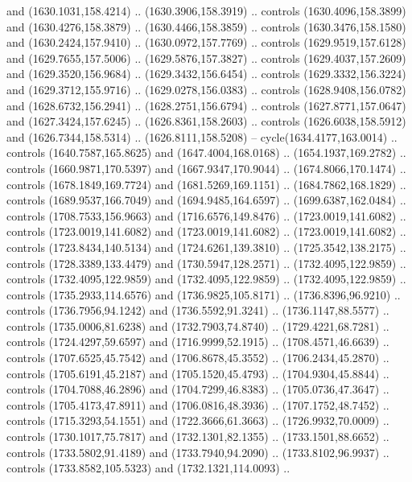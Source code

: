 \begin{scope}[shift={(-22.88722,-49.76189)}]
\begin{scope}[shift={(-739.46591,328.36782)}]
      and (1630.1031,158.4214) .. (1630.3906,158.3919) .. controls
      (1630.4096,158.3899) and (1630.4276,158.3879) .. (1630.4466,158.3859) ..
      controls (1630.3476,158.1580) and (1630.2424,157.9410) .. (1630.0972,157.7769)
      .. controls (1629.9519,157.6128) and (1629.7655,157.5006) ..
      (1629.5876,157.3827) .. controls (1629.4037,157.2609) and (1629.3520,156.9684)
      .. (1629.3432,156.6454) .. controls (1629.3332,156.3224) and
      (1629.3712,155.9716) .. (1629.0278,156.0383) .. controls (1628.9408,156.0782)
      and (1628.6732,156.2941) .. (1628.2751,156.6794) .. controls
      (1627.8771,157.0647) and (1627.3424,157.6245) .. (1626.8361,158.2603) ..
      controls (1626.6038,158.5912) and (1626.7344,158.5314) .. (1626.8111,158.5208)
      -- cycle(1634.4177,163.0014) .. controls (1640.7587,165.8625) and
      (1647.4004,168.0168) .. (1654.1937,169.2782) .. controls (1660.9871,170.5397)
      and (1667.9347,170.9044) .. (1674.8066,170.1474) .. controls
      (1678.1849,169.7724) and (1681.5269,169.1151) .. (1684.7862,168.1829) ..
      controls (1689.9537,166.7049) and (1694.9485,164.6597) .. (1699.6387,162.0484)
      .. controls (1708.7533,156.9663) and (1716.6576,149.8476) ..
      (1723.0019,141.6082) .. controls (1723.0019,141.6082) and (1723.0019,141.6082)
      .. (1723.0019,141.6082) .. controls (1723.8434,140.5134) and
      (1724.6261,139.3810) .. (1725.3542,138.2175) .. controls (1728.3389,133.4479)
      and (1730.5947,128.2571) .. (1732.4095,122.9859) .. controls
      (1732.4095,122.9859) and (1732.4095,122.9859) .. (1732.4095,122.9859) ..
      controls (1735.2933,114.6576) and (1736.9825,105.8171) .. (1736.8396,96.9210)
      .. controls (1736.7956,94.1242) and (1736.5592,91.3241) .. (1736.1147,88.5577)
      .. controls (1735.0006,81.6238) and (1732.7903,74.8740) .. (1729.4221,68.7281)
      .. controls (1724.4297,59.6597) and (1716.9999,52.1915) .. (1708.4571,46.6639)
      .. controls (1707.6525,45.7542) and (1706.8678,45.3552) .. (1706.2434,45.2870)
      .. controls (1705.6191,45.2187) and (1705.1520,45.4793) .. (1704.9304,45.8844)
      .. controls (1704.7088,46.2896) and (1704.7299,46.8383) .. (1705.0736,47.3647)
      .. controls (1705.4173,47.8911) and (1706.0816,48.3936) .. (1707.1752,48.7452)
      .. controls (1715.3293,54.1551) and (1722.3666,61.3663) .. (1726.9932,70.0009)
      .. controls (1730.1017,75.7817) and (1732.1301,82.1355) .. (1733.1501,88.6652)
      .. controls (1733.5802,91.4189) and (1733.7940,94.2090) .. (1733.8102,96.9937)
      .. controls (1733.8582,105.5323) and (1732.1321,114.0093) ..

\end{scope}
\end{scope}
